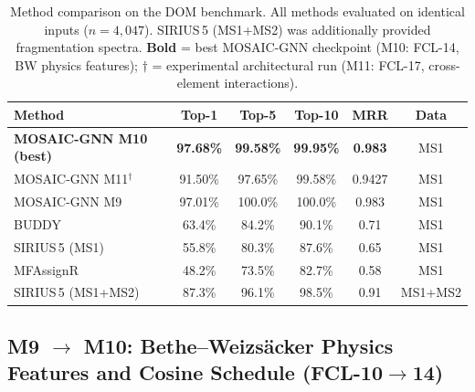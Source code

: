 \documentclass[journal=jcisd8]{achemso}
\begin{document}
\begin{table}[H]
\centering
\small
\caption{Method comparison on the DOM benchmark.  All methods evaluated on identical inputs
($n=4{,}047$).  SIRIUS\,5 (MS1+MS2) was additionally provided fragmentation spectra.
\textbf{Bold} = best MOSAIC-GNN checkpoint (M10: FCL-14, BW physics features);
$\dagger$ = experimental architectural run (M11: FCL-17, cross-element interactions).}
\label{tab:benchmark}
\footnotesize
\begin{tabular}{lccccc}
\toprule
\textbf{Method} & \textbf{Top-1} & \textbf{Top-5} & \textbf{Top-10} & \textbf{MRR} & \textbf{Data} \\
\midrule
\textbf{MOSAIC-GNN M10 (\textbf{best})}              & \textbf{97.68\%} & \textbf{99.58\%} & \textbf{99.95\%} & \textbf{0.983}  & MS1 \\
MOSAIC-GNN M11$^{\dagger}$                           & 91.50\%  & 97.65\%          & 99.58\%          & 0.9427          & MS1 \\
MOSAIC-GNN M9                                        & 97.01\%          & 100.0\%          & 100.0\%          & 0.983          & MS1 \\
BUDDY                                                & 63.4\%           & 84.2\%           & 90.1\%           & 0.71           & MS1 \\
SIRIUS\,5 (MS1)                                      & 55.8\%           & 80.3\%           & 87.6\%           & 0.65           & MS1 \\
MFAssignR                                            & 48.2\%           & 73.5\%           & 82.7\%           & 0.58           & MS1 \\
\midrule
SIRIUS\,5 (MS1+MS2)                                  & 87.3\%           & 96.1\%           & 98.5\%           & 0.91           & MS1+MS2 \\
\bottomrule
\end{tabular}
\end{table}


\subsection{M9 \texorpdfstring{$\to$}{→} M10: Bethe--Weizs\"{a}cker Physics Features and Cosine Schedule (FCL-10\texorpdfstring{$\to$}{→}14)}
\label{sec:run_comparison}
\end{document}
